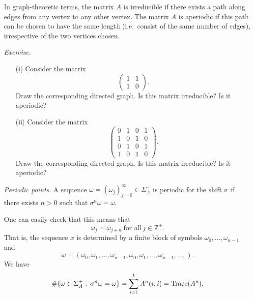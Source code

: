 \documentclass[12pt]{article}
\theoremstyle{definition}
\theoremstyle{remark}
\begin{document}
In graph-theoretic terms, the matrix $A$  is irreducible if there
exists a path along edges from any vertex to any other vertex.  The
matrix $A$ is aperiodic if this path can be chosen to have the same
length (i.e.\ consist of the same number of edges), irrespective of
the two vertices chosen.

\medskip
\noindent
{\it Exercise.}
\begin{itemize}
\item[(i)]
Consider the matrix
\[
 \left( \begin{array}{cc} 1 & 1 \\ 1 & 0 \end{array} \right).
\]
Draw the corresponding directed graph.  Is this matrix irreducible?  Is it
aperiodic?
\item[(ii)]
Consider the matrix
\[
 \left( \begin{array}{cccc} 0 & 1 & 0 & 1 \\
                          1 & 0 & 1 & 0 \\
                          0 & 1 & 0 & 1 \\
                          1 & 0 & 1 & 0 \end{array} \right).
\]
Draw the corresponding directed graph.  Is this matrix irreducible?  Is it
aperiodic?
\end{itemize}
\medskip



\medskip
\noindent
{\it Periodic points.}
A sequence $\omega=(\omega_{j})_{j=0}^{\infty} \in \Sigma_{A}^{+}$ is periodic for
the shift $\sigma$ if there exists $n > 0$ such that
$\sigma^{n}\omega=\omega$.

One can easily check that this means that
\[ 
 \omega_{j} = \omega_{j+n}\ \mbox{for all}\ j \in \mathbb Z^+.
\]
That is, the sequence $x$ is determined by a finite block of symbols
$\omega_{0}, \ldots, \omega_{n-1}$ and
\[
 \omega = (\omega_{0}, \omega_{1}, \ldots, \omega_{n-1}, \omega_{0}, \omega_{1}, \ldots, \omega_{n-1},
 \ldots,).
\]
We have
\[
\#\{\omega \in \Sigma_A^+ \hbox{ : } \sigma^n\omega=\omega\} = \sum_{i=1}^k A^n(i,i) =
\mathrm{Trace}(A^n).
\]



\end{document}
